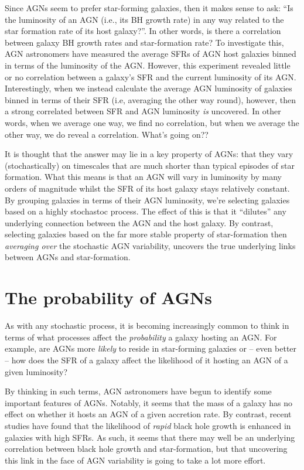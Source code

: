 \documentclass[11pt]{article}
\begin{document}
Since AGNs seem to prefer star-forming galaxies, then it makes sense
to ask: ``Is the luminosity of an AGN (i.e., its BH growth rate) in
any way related to the star formation rate of its host galaxy?''. In
other words, is there a correlation between galaxy BH growth rates and
star-formation rate? To investigate this, AGN astronomers have
measured the average SFRs of AGN host galaxies binned in terms of the
luminosity of the AGN. However, this experiment revealed little or no
correlation between a galaxy's SFR and the current luminosity of its
AGN. Interestingly, when we instead calculate the average AGN
luminosity of galaxies binned in terms of their SFR (i.e, averaging the other
way round), however, then a strong correlated between SFR and AGN
luminosity {\it is} uncovered. In other words, when we average one
way, we find no correlation, but when we average the other way, we do
reveal a correlation. What's going on??

It is thought that the answer may lie in a key property of AGNs: that
they vary (stochastically) on timescales that are much shorter than
typical episodes of star formation. What this means is that an AGN
will vary in luminosity by many orders of magnitude whilst the SFR of
its host galaxy stays relatively constant. By grouping galaxies in
terms of their AGN luminosity, we're selecting galaxies based on a
highly stochastoc process. The effect of this is that it ``dilutes''
any underlying connection between the AGN and the host galaxy. By
contrast, selecting galaxies based on the far more stable property of
star-formation then {\it averaging over} the stochastic AGN
variability, uncovers the true underlying links between AGNs and
star-formation.

\section{The probability of AGNs}
As with any stochastic process, it is becoming increasingly common to
think in terms of what processes affect the {\it probability} a galaxy
hosting an AGN. For example, are AGNs more {\it likely} to reside in
star-forming galaxies or -- even better -- how does the SFR of a
galaxy affect the likelihood of it hosting an AGN of a given
luminosity?

By thinking in such terms, AGN astronomers have begun to identify some
important features of AGNs. Notably, it seems that the mass of a
galaxy has no effect on whether it hosts an AGN of a given accretion
rate. By contrast, recent studies have found that the likelihood of
{\it rapid} black hole growth is enhanced in galaxies with high
SFRs. As such, it seems that there may well be an underlying
correlation between black hole growth and star-formation, but that
uncovering this link in the face of AGN variability is going to take a
lot more effort.
\end{document}
